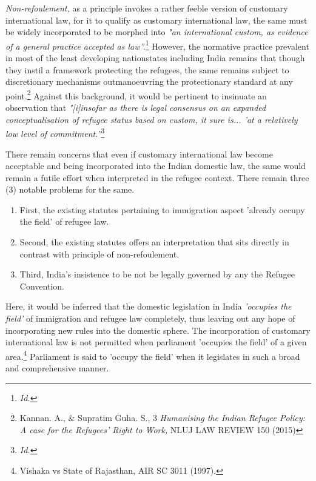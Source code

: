 \begin{multicols}{2}
\noi
\textit{Non-refoulement,} as a principle invokes a rather feeble version of customary international
law, for it to qualify as customary international law, the same must be widely incorporated to
be morphed into \textit{"an international custom, as evidence of a general practice accepted as
law”.}\footnote{\textit{Id.}} However, the normative practice prevalent in most of the least developing nationstates including India remains that though they instil a framework protecting the refugees, the
same remains subject to discretionary mechanisms outmanoeuvring the protectionary
standard at any point.\footnote{Kannan. A., \& Supratim Guha. S., 3 \textit{Humanising the Indian Refugee Policy: A case for the Refugees’ Right to Work,} NLUJ LAW REVIEW 150 (2015)} Against this background, it would be pertinent to insinuate an observation that \textit{"[i]insofar as there is legal consensus on an expanded conceptualisation of
refugee status based on custom, it sure is... 'at a relatively low level of commitment.”}\footnote{\textit{Id.}}


\noi
There remain concerns that even if customary international law become acceptable and being
incorporated into the Indian domestic law, the same would remain a futile effort when
interpreted in the refugee context. There remain three (3) notable problems for the same.

\begin{enumerate}[label=$\bullet$]
\item First, the existing statutes pertaining to immigration aspect 'already occupy the field'
of refugee law.

\item Second, the existing statutes offers an interpretation that sits directly in contrast with
principle of non-refoulement.

\item Third, India’s insistence to be not be legally governed by any the Refugee
Convention.
\end{enumerate}

\vspace{-.3cm}

\noi
Here, it would be inferred that the domestic legislation in India \textit{'occupies the field'} of
immigration and refugee law completely, thus leaving out any hope of incorporating new
rules into the domestic sphere. The incorporation of customary international law is not
permitted when parliament 'occupies the field' of a given area.\footnote{Vishaka vs State of Rajasthan, AIR SC 3011 (1997).} Parliament is said to 'occupy the field' when it legislates in such a broad and comprehensive manner.


\end{multicols}
